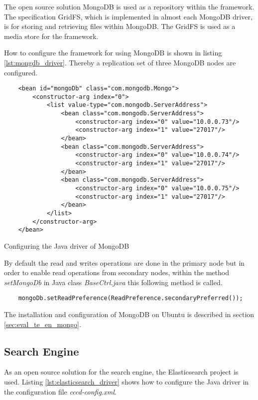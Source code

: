 The open source solution MongoDB is used as a repository within the framework. The specification GridFS, which is implemented in almost each MongoDB driver, is for storing and retrieving files within MongoDB. The GridFS is used as a media store for the framework.

How to configure the framework for using MongoDB is shown in listing \ref{lst:mongdb_driver}. Thereby a replication set of three MongoDB nodes are configured. 

\begin{code}
\begin{verbatim}
    <bean id="mongoDb" class="com.mongodb.Mongo">
        <constructor-arg index="0">
            <list value-type="com.mongodb.ServerAddress">
                <bean class="com.mongodb.ServerAddress">
                    <constructor-arg index="0" value="10.0.0.73"/>
                    <constructor-arg index="1" value="27017"/>
                </bean>
                <bean class="com.mongodb.ServerAddress">
                    <constructor-arg index="0" value="10.0.0.74"/>
                    <constructor-arg index="1" value="27017"/>
                </bean>
                <bean class="com.mongodb.ServerAddress">
                    <constructor-arg index="0" value="10.0.0.75"/>
                    <constructor-arg index="1" value="27017"/>
                </bean>
            </list>
        </constructor-arg>
    </bean>
\end{verbatim}
\caption{Configuring the Java driver of MongoDB}
\label{lst:mongdb_driver}
\end{code}

By default the read and writes operations are done in the primary node but in order to enable read operations from secondary nodes, within the method \textit{setMongoDb} in Java class \textit{BaseCtrl.java} this following method is called. \textit{}
\begin{code}
\begin{verbatim}
	mongoDb.setReadPreference(ReadPreference.secondaryPreferred());
\end{verbatim}
\end{code}

The installation and configuration of MongoDB on Ubuntu is described in section \ref{sec:eval_te_en_mongo}.

\subsection{Search Engine\label{sec:des_se_en}}
As an open source solution for the search engine, the Elasticsearch project is used. Listing \ref{lst:elasticsearch_driver} shows how to configure the Java driver in the configuration file \textit{cccd-config.xml}.

